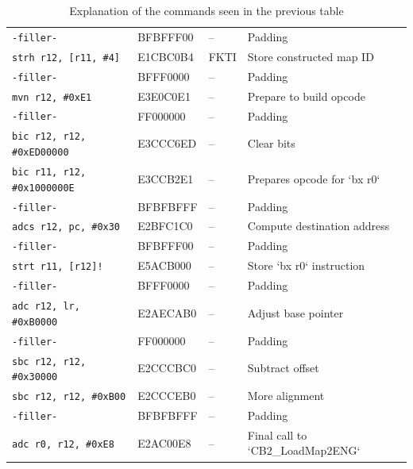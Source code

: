 \documentclass[a4paper]{usiinfbachelorproject}
\begin{document}
\begin{table}[htbp]
\begin{tabular}{|l|l|l|p{6cm}|}
		\texttt{-filler-}                   & BFBFFF00              & --                      & Padding                            \\
		\texttt{strh r12, [r11, \#4]}       & E1CBC0B4              & FKTI                    & Store constructed map ID           \\
		\texttt{-filler-}                   & BFFF0000              & --                      & Padding                            \\
		\texttt{mvn r12, \#0xE1}            & E3E0C0E1              & --                      & Prepare to build opcode            \\
		\texttt{-filler-}                   & FF000000              & --                      & Padding                            \\
		\texttt{bic r12, r12, \#0xED00000}  & E3CCC6ED              & --                      & Clear bits                         \\
		\texttt{bic r11, r12, \#0x1000000E} & E3CCB2E1              & --                      & Prepares opcode for `bx r0`        \\
		\texttt{-filler-}                   & BFBFBFFF              & --                      & Padding                            \\
		\texttt{adcs r12, pc, \#0x30}       & E2BFC1C0              & --                      & Compute destination address        \\
		\texttt{-filler-}                   & BFBFFF00              & --                      & Padding                            \\
		\texttt{strt r11, [r12]!}           & E5ACB000              & --                      & Store `bx r0` instruction          \\
		\texttt{-filler-}                   & BFFF0000              & --                      & Padding                            \\
		\texttt{adc r12, lr, \#0xB0000}     & E2AECAB0              & --                      & Adjust base pointer                \\
		\texttt{-filler-}                   & FF000000              & --                      & Padding                            \\
		\texttt{sbc r12, r12, \#0x30000}    & E2CCCBC0              & --                      & Subtract offset                    \\
		\texttt{sbc r12, r12, \#0xB00}      & E2CCCEB0              & --                      & More alignment                     \\
		\texttt{-filler-}                   & BFBFBFFF              & --                      & Padding                            \\
		\texttt{adc r0, r12, \#0xE8}        & E2AC00E8              & --                      & Final call to `CB2\_LoadMap2ENG`   \\
		\hline
	\end{tabular}

	\caption{Explanation of the commands seen in the previous table}
	\label{tab:boxes_names_explanation}
\end{table}
\end{document}
